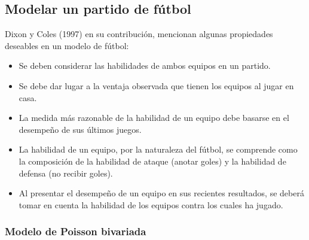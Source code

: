 \subsection{Modelar un partido de fútbol}
\label{subsec:modelo}


%


Dixon y Coles (1997) \cite{dixon1997modelling} en su contribución, mencionan algunas propiedades deseables en un modelo de fútbol:
\begin{itemize}
	\item Se deben considerar las habilidades de ambos equipos en un partido.
	\item Se debe dar lugar a la ventaja observada que tienen los equipos al jugar en casa.
	\item La medida más razonable de la habilidad de un equipo debe basarse en el desempeño de sus últimos juegos.
	\item La habilidad de un equipo, por la naturaleza del fútbol, se comprende como la composición de la habilidad de ataque (anotar goles) y la habilidad de defensa (no recibir goles).
	\item Al presentar el desempeño de un equipo en sus recientes resultados, se deberá tomar en cuenta la habilidad de los equipos contra los cuales ha jugado.
\end{itemize}


 \subsubsection{Modelo de Poisson bivariada}
 \label{subsubsec:bivariate-poisson}

